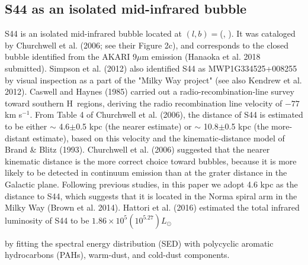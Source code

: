 \documentclass[onecolumn]{pasj01}
\begin{document}
{\subsection{S44 as {an isolated mid-infrared bubble}}
{S44} is {an isolated} mid-infrared bubble located {at} $(l,b)=$(, ). {It was} cataloged by Churchwell et al. (2006; see their Figure 2c), and {corresponds} to the closed bubble {identified} from the AKARI 9$\mu$m emission (Hanaoka et al. 2018 submitted). Simpson et al. (2012) also identified S44 as MWP1G334525+008255 by visual inspection {as a part of the "Milky Way project" (see also Kendrew et al. 2012)}. 
{Caswell and Haynes (1985) carried out {a} radio-recombination-line survey toward southern H\, regions, deriving the radio recombination line velocity of $-77$ km s$^{-1}$}.
 From Table 4 of Churchwell et al. (2006), the distance of S44 is estimated {to be} {either} $\sim$ 4.6$\pm$0.5 kpc {(the nearer estimate)} or $\sim$ 10.8$\pm$0.5 kpc {(the more-distant estimate), based on this velocity and} the kinematic-distance model of Brand \& Blitz (1993).
{{Churchwell et al. (2006)} suggested that the {nearer} kinematic distance is {the more} correct choice toward {bubbles,} because it is {more} likely to be detected in continuum emission than {at the grater} distance in the Galactic plane.}
Following previous {studies}, {in this paper we adopt} 4.6 kpc as the distance {to} S44{, which {suggests that it is located} in the Norma spiral arm in the Milky Way (Brown et al. 2014).}
{Hattori et al. (2016) estimated} the total infrared luminosity of S44 to be $1.86\times10^5 (10^{5.27}) L_{\odot}$} {by fitting the} spectral energy distribution (SED) {with} polycyclic aromatic hydrocarbons (PAHs), warm-dust, and cold-dust components. 
\end{document}
